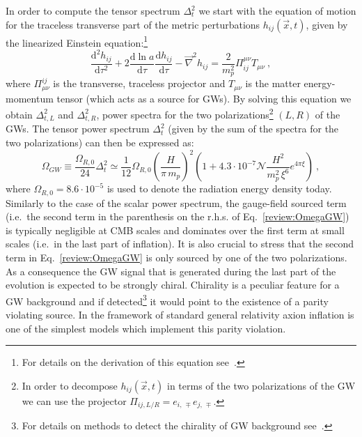 In order to compute the tensor spectrum $\Delta^2_{t}$ we start with the equation of motion for the traceless transverse part of the metric perturbations $h_{ij}(\vec{x},t)$, given by the linearized Einstein equation:\footnote{For details on the derivation of this equation see~\cite{Maggiore:1900zz}.}
 \begin{equation}
\frac{\textrm{d}^2 h_{ij}}{\textrm{d} \tau^2} + 2 \frac{\textrm{d} \ln a}{\textrm{d} \tau} \frac{\textrm{d} h_{ij}}{\textrm{d} \tau} - \vec{\nabla}^2 h_{ij} = \frac{2}{m_p^2} \Pi_{ij}^{\mu \nu} T_{\mu \nu} \ ,
\label{review:linearized_einstein}
 \end{equation}
where $\Pi^{ij}_{\mu \nu}$ is the transverse, traceless projector and $T_{\mu \nu}$ is the matter energy-momentum tensor (which acts as a source for GWs). By solving this equation we obtain $\Delta^2_{t,L}$ and $\Delta^2_{t,R}$, power spectra for the two polarizations\footnote{In order to decompose $h_{ij}(\vec{x},t)$ in terms of the two polarizations of the GW we can use the projector $\Pi_{ij,L/R} = e_{i, \, \mp} e_{j, \, \mp}$.} $(L,R)$ of the GWs. The tensor power spectrum $\Delta^2_{t}$ (given by the sum of the spectra for the two polarizations) can then be expressed as:
\begin{equation}
\Omega_{GW} \equiv \frac{\Omega_{R,0}}{24} \Delta^2_{t} \simeq \frac{1}{12} \Omega_{R,0} \left(  \frac{H}{ \pi \, m_p } \right)^2 \left(1 + 4.3 \cdot 10^{-7} \mathcal{N} \frac{H^2}{ m_p^2 \, \xi^6} e^{4 \pi \xi}\right)\ ,
\label{review:OmegaGW}
\end{equation} 
where $\Omega_{R,0} = 8.6 \cdot 10^{-5}$ is used to denote the radiation energy density today. Similarly to the case of the scalar power spectrum, the gauge-field sourced term (i.e.\ the second term in the parenthesis on the r.h.s. of Eq.~\eqref{review:OmegaGW}) is typically negligible at CMB scales and dominates over the first term at small scales (i.e.\ in the last part of inflation). It is also crucial to stress that the second term in Eq.~\eqref{review:OmegaGW} is only sourced by one of the two polarizations. As a consequence the GW signal that is generated during the last part of the evolution is expected to be strongly chiral. Chirality is a peculiar feature for a GW background and if detected\footnote{For details on methods to detect the chirality of GW background see~\cite{Crowder:2012ik}.} it would point to the existence of a parity violating source. In the framework of standard general relativity axion inflation is one of the simplest models which implement this parity violation.

